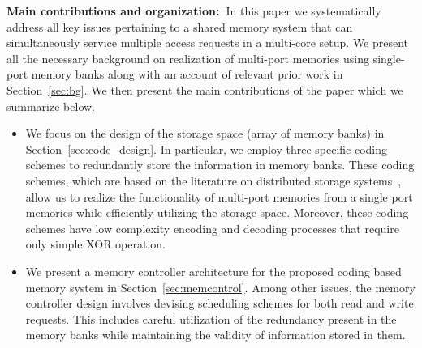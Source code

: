 \noindent \textbf{Main contributions and organization:~}In this paper we systematically address all key issues pertaining to a shared memory system that can simultaneously service multiple access requests in a multi-core setup. We present all the necessary background on realization of multi-port memories using single-port memory banks along with an account of relevant prior work in Section~\ref{sec:bg}. We then present the main contributions of the paper which we summarize below. %
\begin{itemize}
\item We focus on the design of the storage space (array of memory banks) in Section~\ref{sec:code_design}. In particular, we employ three specific coding schemes to redundantly store the information in memory banks. These coding schemes, which are based on the literature on distributed storage systems~\cite{dimakis, Gopalan12, batchcodes, RPDV16}, allow us to realize the functionality of multi-port memories from a single port memories while efficiently utilizing the storage space. Moreover, these coding schemes have low complexity encoding and decoding processes that require only simple XOR operation. %
\item We present a memory controller architecture for the proposed coding based memory system in Section~\ref{sec:memcontrol}. Among other issues, the memory controller design involves devising scheduling schemes for both read and write requests. This includes careful utilization of the redundancy present in the memory banks while maintaining the validity of information stored in them.

\end{itemize}
